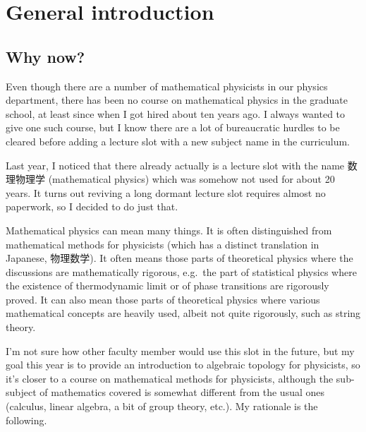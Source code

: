 \documentclass[12pt]{article}
\numberwithin{equation}{section}
\theoremstyle{remark}
\begin{document}
\section{General introduction}

\subsection{Why now?}
\label{sec:whynow}

Even though there are a number of mathematical physicists in our physics department,
there has been no course on mathematical physics in the graduate school,
at least since when I got hired about ten years ago.
I always wanted to give one such course, but I know 
there are a lot of bureaucratic hurdles to be cleared before adding a lecture slot with a new subject name in the curriculum.

Last year, I noticed that there already actually is a lecture slot with the name
数理物理学 (mathematical physics)
which was somehow not used for about 20 years.
It turns out reviving a long dormant lecture slot requires almost no paperwork,
so I decided to do just that.

Mathematical physics can mean many things. 
It is often distinguished from mathematical methods for physicists (which has a distinct translation in Japanese, 物理数学).
It often means those parts of theoretical physics where the discussions are mathematically rigorous,
e.g.~the part of statistical physics where the existence of thermodynamic limit or of phase transitions are rigorously proved.
It can also mean those parts of theoretical physics where various mathematical concepts are heavily used, albeit not quite rigorously,
such as string theory.


I'm not sure how other faculty member would use this slot in the future,
but my goal this year is to provide an introduction to algebraic topology for physicists,
so it's closer to a course on mathematical methods for physicists,
although the sub-subject of mathematics covered is somewhat different from the usual ones (calculus, linear algebra, a bit of group theory, etc.).
My rationale is the following.
\end{document}

